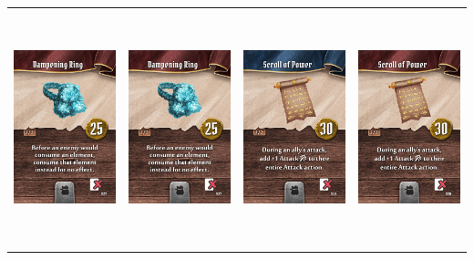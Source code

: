 \documentclass{minimal}
\begin{document}
{\begin{longtable}{llll}
\includegraphics[width=44mm,height=68mm]{./64-151/gh-092b-dampening-ring.png} &
\includegraphics[width=44mm,height=68mm]{./64-151/gh-092b-dampening-ring.png} &
\includegraphics[width=44mm,height=68mm]{./64-151/gh-093a-scroll-of-power.png} &
\includegraphics[width=44mm,height=68mm]{./64-151/gh-093b-scroll-of-power.png}\\ 

\end{longtable}}
\end{document}
